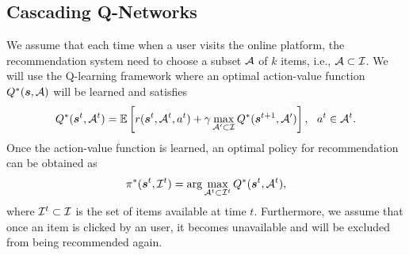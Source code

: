 \documentclass{article} %
\newcommand{\Le}[1]{{\color{red}{\bf\sf [ #1]}}}
\begin{document}

\vspace{-3mm}
\subsection{Cascading Q-Networks}
\vspace{-3mm}

We assume that each time when a user visits the online platform, 
the recommendation system need to choose a subset ${\mathcal{A}}$ of $k$ items, i.e., ${\mathcal{A}} \subset {\mathcal{I}}$. We will use the Q-learning framework where an optimal action-value function $Q^*({\bm{s}},{\mathcal{A}})$ will be learned and satisfies
{\small \begin{equation}\label{eqn:bellman}
		Q^*({\bm{s}}^t, {\mathcal{A}}^t) =\mathbb{E}\left[r({\bm{s}}^t, {\mathcal{A}}^t, a^t) + \gamma  \max_{{\mathcal{A}}'\subset {\mathcal{I}}}Q^*({\bm{s}}^{t+1}, {\mathcal{A}}')\right],~~a^t \in {\mathcal{A}}^t.
\end{equation}}
Once the action-value function is learned, an optimal policy for recommendation can be obtained as
{\small \begin{equation}\label{eq:policy}
	\pi^\ast({\bm{s}}^t, {\mathcal{I}}^t)=\arg\max_{{\mathcal{A}}^t\subset {\mathcal{I}}^t}Q^*({\bm{s}}^t, {\mathcal{A}}^t), 
\end{equation}}
where ${\mathcal{I}}^t \subset {\mathcal{I}}$ is the set of items available at time $t$. Furthermore, we assume that once an item is clicked by an user, it becomes unavailable and will be excluded from being recommended again. 
\end{document}
